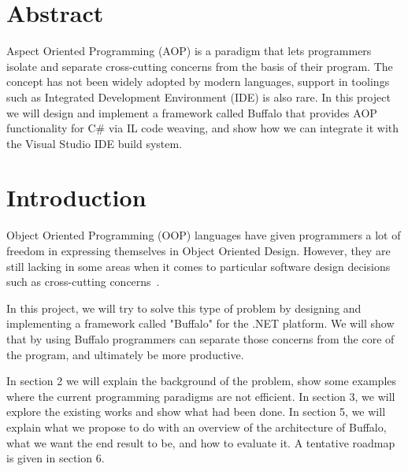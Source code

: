 \newcommand{\etc} {\emph{etc.\/}}
\newcommand{\etal}{\emph{et~al.\/}}
\newcommand{\eg}  {\emph{e.g.\/}}
\newcommand{\ie}  {\emph{i.e.\/}}


\section*{Abstract}
Aspect Oriented Programming (AOP) is a paradigm that lets programmers isolate and separate cross-cutting concerns from the basis of their program. The concept has not been widely adopted by modern languages, support in toolings such as Integrated Development Environment (IDE) is also rare. In this project we will design and implement a framework called Buffalo that provides AOP functionality for C\# via IL code weaving, and show how we can integrate it with the Visual Studio IDE build system.
\vfill{}

\setcounter{page}{0} 
\newpage{}
\section{Introduction}
Object Oriented Programming (OOP) languages have given programmers a lot of freedom in expressing themselves in Object Oriented Design. However, they are still lacking in some areas when it comes to particular software design decisions such as cross-cutting concerns~\cite{aop}. 

In this project, we will try to solve this type of problem by designing and implementing a framework called "Buffalo" for the .NET platform. We will show that by using Buffalo programmers can separate those concerns from the core of the program, and ultimately be more productive.

In section 2 we will explain the background of the problem, show some examples where the current programming paradigms are not efficient. In section 3, we will explore the existing works and show what had been done. In section 5, we will explain what we propose to do with an overview of the architecture of Buffalo, what we want the end result to be, and how to evaluate it. A tentative roadmap is given in section 6.

